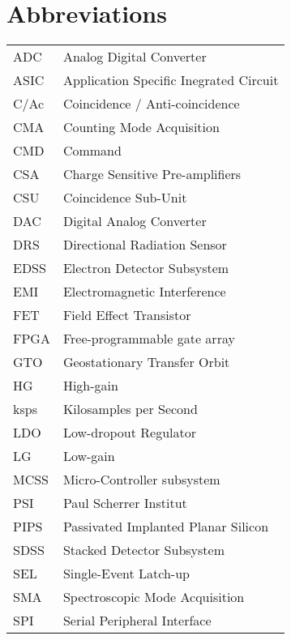 \section*{Abbreviations}
\label{sec:abbreviations}

\begin{center}
\begin{tabular}{p{2cm}p{8cm}}
	ADC & Analog Digital Converter \\
	ASIC & Application Specific Inegrated Circuit \\
    C/Ac & Coincidence / Anti-coincidence \\
    CMA & Counting Mode Acquisition \\
    CMD & Command					\\
	CSA & Charge Sensitive Pre-amplifiers \\
	CSU & Coincidence Sub-Unit \\
	DAC & Digital Analog Converter \\
	DRS & Directional Radiation Sensor \\
	EDSS & Electron Detector Subsystem \\
	EMI & Electromagnetic Interference \\
	FET & Field Effect Transistor \\
    FPGA & Free-programmable gate array \\
	GTO & Geostationary Transfer Orbit \\
    HG & High-gain \\
    ksps & Kilosamples per Second \\
	LDO & Low-dropout Regulator \\
    LG & Low-gain \\
    MCSS & Micro-Controller subsystem \\
	PSI & Paul Scherrer Institut \\
	PIPS & Passivated Implanted Planar Silicon \\
	SDSS & Stacked Detector Subsystem \\
	SEL & Single-Event Latch-up \\
    SMA & Spectroscopic Mode Acquisition \\
	SPI & Serial Peripheral Interface \\
\end{tabular}
\end{center}
